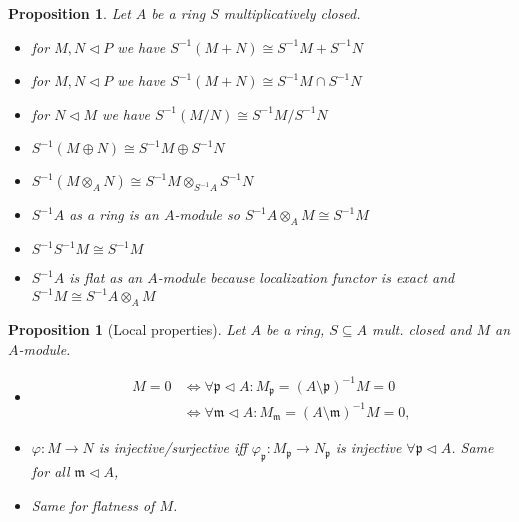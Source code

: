 \documentclass{article}
\newcommand{\maxid}{\mathfrak{m}}
\newcommand{\primeid}{\mathfrak{p}}
\newcommand{\ideal}{\triangleleft}
\newtheorem{proposition}[theorem]{Proposition}
\theoremstyle{definition}
\begin{document}
\begin{proposition}
    Let \(A\) be a ring \(S\) multiplicatively closed.
    \begin{itemize}
        \item for \(M,N\ideal P\) we have \(S^{-1}(M+ N)\cong S^{-1}M+ S^{-1}N\)
        \item for \(M,N\ideal P\) we have \(S^{-1}(M+ N)\cong S^{-1}M\cap
              S^{-1}N\)
        \item for \(N\ideal M\) we have \(S^{-1}(M/N)\cong S^{-1}M/S^{-1}N\)
        \item \(S^{-1}(M\oplus N)\cong S^{-1}M\oplus S^{-1}N\)
        \item \(S^{-1}(M\otimes_{A} N)\cong S^{-1}M\otimes_{S^{-1}A}S^{-1}N\)
        \item \(S^{-1}A\) as a ring is an \(A\)-module so
              \(S^{-1}A\otimes_{A}M\cong S^{-1}M\)
        \item \(S^{-1}S^{-1}M\cong S^{-1}M\)
        \item \(S^{-1}A\) is flat as an \(A\)-module because localization
              functor is exact and \(S^{-1}M\cong S^{-1}A\otimes_{A}M\)
    \end{itemize}
\end{proposition}

\begin{proposition}[Local properties]
    Let \(A\) be a ring, \(S\subseteq A\) mult. closed and \(M\) an \(A\)-module.
    \begin{itemize}
        \item
              \begin{align*}
                  M=0 & \Leftrightarrow \forall\primeid\ideal A:M_{\primeid}=(A\setminus\primeid)^{-1}M=0 \\
                      & \Leftrightarrow \forall\maxid\ideal A:M_{\maxid}=(A\setminus\maxid)^{-1}M=0,
              \end{align*}

        \item \(\varphi:M\to N\) is injective/surjective iff
              \(\varphi_{\primeid}:M_{\primeid}\to N_{\primeid}\) is injective
              \(\forall\primeid\ideal A\). Same for all \(\maxid\ideal A\),

        \item Same for flatness of \(M\).
    \end{itemize}
\end{proposition}
\end{document}
